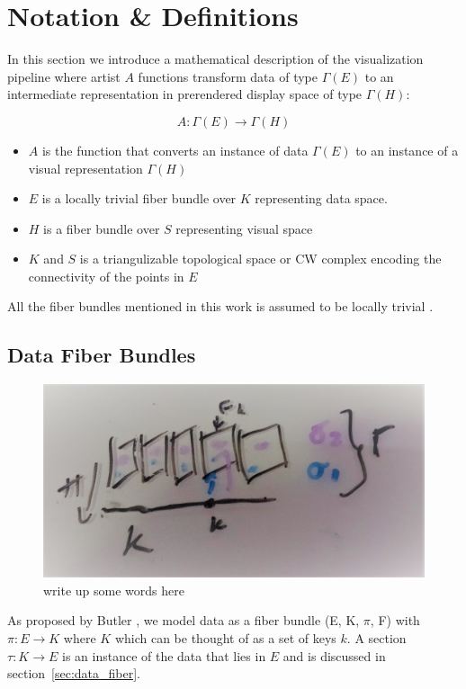 \documentclass[../main.tex]{subfiles}
\begin{document}
\section{Notation \& Definitions}
In this section we introduce a mathematical description of the visualization pipeline where artist $A$ functions transform data of type $\Gamma(E)$ to an intermediate representation in prerendered display space of type $\Gamma(H)$:

\begin{equation}
    \label{eq:artist}
    A: \Gamma(E) \rightarrow \Gamma(H)
\end{equation}

\begin{itemize}
\item $A$ is the function that converts an instance of data $\Gamma(E)$ to an instance of a visual representation $\Gamma(H)$ 
\item $E$ is a locally trivial fiber bundle over $K$ representing data space.
\item $H$ is a fiber bundle over $S$ representing visual space
\item $K$ and $S$ is a triangulizable topological space or CW complex encoding the connectivity of the points in $E$
\end{itemize}
All the fiber bundles mentioned in this work is assumed to be locally trivial \cite{rowlandFiberBundle,FiberBundle2020}. 

\subsection{Data Fiber Bundles}
\begin{figure}[H]
    \label{fig:data_fiber_bundle}
    \includegraphics[width=.2\linewidth]{figures/sections/math/fiberbundle.png}
    \caption{write up some words here}
\end{figure}

As proposed by Butler \cite{butlerVectorBundleClassesForm1992,butlerVisualizationModelBased1989}, we model data as a fiber bundle (E, K, $\pi$, F) with $\pi: E \rightarrow K$ where $K$ which can be thought of as a set of keys $k$. A section $\tau:K \rightarrow E$ is an instance of the data that lies in $E$ and is discussed in section~\ref{sec:data_fiber}. 
\end{document}
